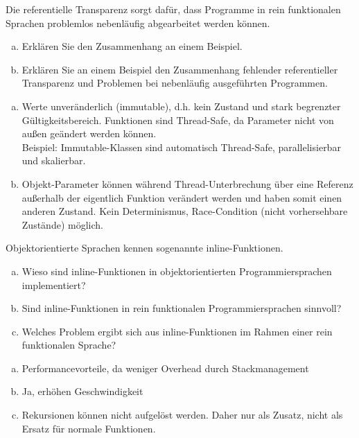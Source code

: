 \begin{card}
	Die referentielle Transparenz sorgt dafür, dass Programme in rein funktionalen Sprachen	problemlos nebenläufig abgearbeitet werden können.
	\begin{enumerate}[a)]
	\item Erklären Sie den Zusammenhang an einem Beispiel.
	\item Erklären Sie an einem Beispiel den Zusammenhang fehlender referentieller Transparenz und Problemen bei nebenläufig ausgeführten Programmen.
	\end{enumerate}
	\hr
	\begin{enumerate}[a)]
	\item Werte unveränderlich (immutable), d.h. kein Zustand und stark begrenzter Gültigkeitsbereich. Funktionen sind Thread-Safe, da Parameter nicht von außen geändert werden können.\\
	Beispiel: Immutable-Klassen sind automatisch Thread-Safe, parallelisierbar und skalierbar.
\item Objekt-Parameter können während Thread-Unterbrechung über eine Referenz außerhalb der eigentlich Funktion verändert werden und haben somit einen anderen Zustand. Kein Determinismus, Race-Condition (nicht vorhersehbare Zustände) möglich.
	\end{enumerate}
\end{card}

\begin{card}
	Objektorientierte Sprachen kennen sogenannte inline-Funktionen.
	\begin{enumerate}[a)]
	\item Wieso sind inline-Funktionen in objektorientierten Programmiersprachen implementiert?
	\item Sind inline-Funktionen in rein funktionalen Programmiersprachen sinnvoll?
	\item Welches Problem ergibt sich aus inline-Funktionen im Rahmen einer rein funktionalen Sprache?
	\end{enumerate}
	\hr
	\begin{enumerate}[a)]
	\item Performancevorteile, da weniger Overhead durch Stackmanagement
	\item Ja, erhöhen Geschwindigkeit
	\item Rekursionen können nicht aufgelöst werden. Daher nur als Zusatz, nicht als Ersatz für normale Funktionen.
	\end{enumerate}
\end{card}

